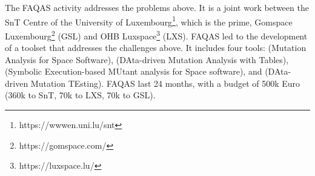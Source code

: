 
The FAQAS activity addresses the problems above. It is a joint work between the SnT Centre of the University of Luxembourg\footnote{https://wwwen.uni.lu/snt}, which is the prime, Gomspace Luxembourg\footnote{https://gomspace.com/} (GSL) and OHB Luxspace\footnote{https://luxspace.lu/} (LXS).
FAQAS led to the development of a toolset that addresses the challenges above. It includes four tools:
 (Mutation Analysis for Space Software),
 (DAta-driven Mutation Analysis with Tables),
 (Symbolic Execution-based MUtant analysis for Space software),
and  (DAta-driven Mutation TEsting).
FAQAS last 24 months, with a budget of 500k Euro (360k to SnT, 70k to LXS, 70k to GSL).


